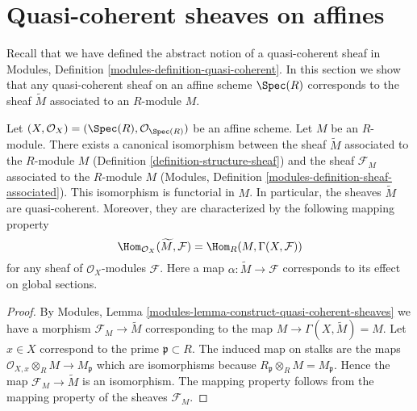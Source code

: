 \section{Quasi-coherent sheaves on affines}
\label{section-quasi-coherent-affine}

\noindent
Recall that we have defined the abstract notion of a quasi-coherent
sheaf in Modules, Definition \ref{modules-definition-quasi-coherent}.
In this section we show that any quasi-coherent sheaf on an affine
scheme $\Spec(R)$ corresponds to the sheaf $\widetilde M$ associated to
an $R$-module $M$.

\begin{lemma}
\label{lemma-compare-constructions}
Let $(X, \mathcal{O}_X) = (\Spec(R), \mathcal{O}_{\Spec(R)})$
be an affine scheme. Let $M$ be an $R$-module. There exists a canonical
isomorphism between the sheaf $\widetilde M$ associated to the $R$-module
$M$ (Definition \ref{definition-structure-sheaf}) and the sheaf
$\mathcal{F}_M$ associated to the $R$-module $M$
(Modules, Definition \ref{modules-definition-sheaf-associated}).
This isomorphism is functorial in $M$. In particular,
the sheaves $\widetilde M$ are quasi-coherent. Moreover, they
are characterized by the following mapping property
$$
\Hom_{\mathcal{O}_X}(\widetilde M, \mathcal{F})
=
\Hom_R(M, \Gamma(X, \mathcal{F}))
$$
for any sheaf of $\mathcal{O}_X$-modules $\mathcal{F}$.
Here a map $\alpha : \widetilde M \to \mathcal{F}$ corresponds
to its effect on global sections.
\end{lemma}

\begin{proof}
By Modules, Lemma \ref{modules-lemma-construct-quasi-coherent-sheaves}
we have a morphism $\mathcal{F}_M \to \widetilde M$ corresponding
to the map $M \to \Gamma(X, \widetilde M) = M$. Let $x \in X$
correspond to the prime $\mathfrak p \subset R$.
The induced map on stalks are the maps
$\mathcal{O}_{X, x} \otimes_R M \to M_{\mathfrak p}$
which are isomorphisms because
$R_{\mathfrak p} \otimes_R M = M_{\mathfrak p}$.
Hence the map $\mathcal{F}_M \to \widetilde M$ is an isomorphism.
The mapping property follows from the mapping property of
the sheaves $\mathcal{F}_M$.
\end{proof}

